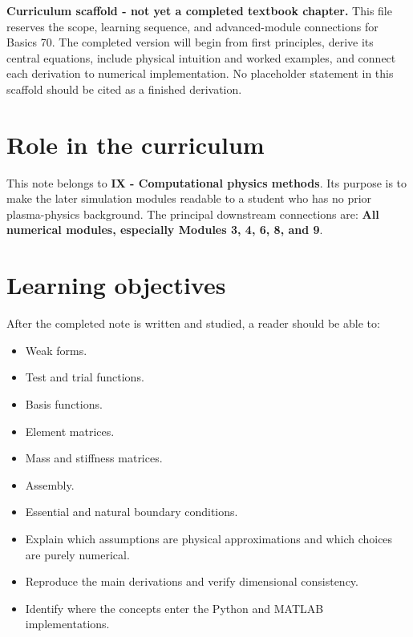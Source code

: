 \documentclass[11pt]{article}
\begin{document}

\begin{overviewbox}
\textbf{Curriculum scaffold - not yet a completed textbook chapter.} This file reserves the scope, learning sequence, and advanced-module connections for Basics 70. The completed version will begin from first principles, derive its central equations, include physical intuition and worked examples, and connect each derivation to numerical implementation. No placeholder statement in this scaffold should be cited as a finished derivation.
\end{overviewbox}

\ProjectTOC

\section{Role in the curriculum}
This note belongs to \textbf{IX - Computational physics methods}. Its purpose is to make the later simulation modules readable to a student who has no prior plasma-physics background. The principal downstream connections are: \textbf{All numerical modules, especially Modules 3, 4, 6, 8, and 9}.

\section{Learning objectives}
After the completed note is written and studied, a reader should be able to:
\begin{itemize}[leftmargin=1.6em]
\item Weak forms.
\item Test and trial functions.
\item Basis functions.
\item Element matrices.
\item Mass and stiffness matrices.
\item Assembly.
\item Essential and natural boundary conditions.
\item Explain which assumptions are physical approximations and which choices are purely numerical.
\item Reproduce the main derivations and verify dimensional consistency.
\item Identify where the concepts enter the Python and MATLAB implementations.
\end{itemize}
\end{document}
